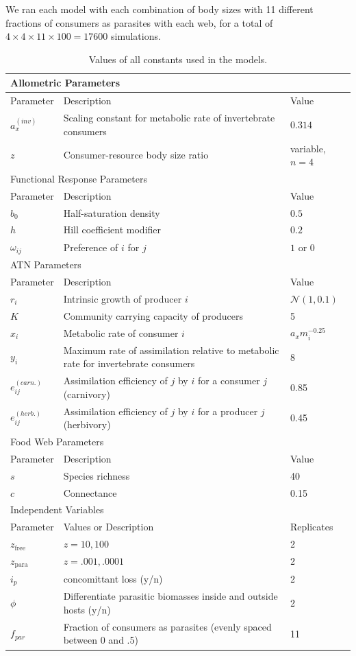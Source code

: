 \documentclass[11pt]{amsart}
\begin{document}
We ran each model with each combination of body sizes with 11 different fractions of consumers as parasites with each web, for a total of $4\times4\times11\times 100 =17600$ simulations. 

\begin{table}
\begin{tabularx}{\textwidth}{|l|X|l|}
\hline
\multicolumn{3}{|X|}{Allometric Parameters}\\
\hline
Parameter&Description&Value\\
\hline
$a_x^{(inv)}$&Scaling constant for metabolic rate of invertebrate consumers & $0.314$\\
$z$&Consumer-resource body size ratio&variable, $n=4$\\
\hline
\hline
\multicolumn{3}{|X|}{Functional Response Parameters}\\
\hline
Parameter&Description&Value\\
\hline
$b_0$&Half-saturation density&$0.5$\\
$h$&Hill coefficient modifier& $0.2$\\
$\omega_{ij}$&Preference of $i$ for $j$&$1$ or $0$\\
\hline
\hline
\multicolumn{3}{|X|}{ATN Parameters}\\
\hline
Parameter&Description&Value\\
\hline
$r_i$&Intrinsic growth of producer $i$&$\mathcal{N}(1,0.1)$\\
$K$&Community carrying capacity of producers &5\\
$x_i$&Metabolic rate of consumer $i$&$a_x m_i^{-0.25}$\\
$y_i$&Maximum rate of assimilation relative to metabolic rate for invertebrate consumers & 8\\
$e_{ij}^{(carn.)}$&Assimilation efficiency of $j$ by $i$ for a consumer $j$ (carnivory) & 0.85\\
$e_{ij}^{(herb.)}$&Assimilation efficiency of $j$ by $i$ for a producer $j$ (herbivory) & 0.45\\
\hline
\hline
\multicolumn{3}{|X|}{Food Web Parameters}\\
\hline
Parameter&Description&Value\\
\hline
$s$&Species richness&40\\
$c$&Connectance & 0.15\\
\hline
\hline
\multicolumn{3}{|X|}{Independent Variables}\\
\hline
Parameter & Values or Description & Replicates\\
$z_\text{free}$&$z=10,100$&2\\
$z_\text{para}$&$z=.001,.0001$&2\\
$i_p$&concomittant loss (y/n)&2\\
$\phi$&Differentiate parasitic biomasses inside and outside hosts (y/n)&2\\
$f_{par}$&Fraction of consumers as parasites (evenly spaced between 0 and .5)&11\\
\hline
\end{tabularx}
\caption{Values of all constants used in the models.  \label{tab:param}}
\end{table}

{}

\end{document}
